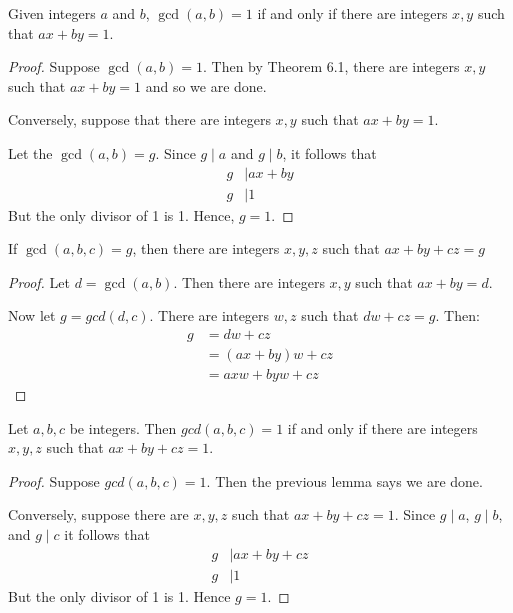 
\begin{lemma}
    Given integers $a$ and $b$, $\gcd(a,b) = 1$ if and only if there are
    integers $x, y$ such that $ax + by = 1$.
\end{lemma}
\begin{proof}
    Suppose $\gcd(a,b) = 1$. Then by Theorem 6.1, there are integers $x,y$ such
    that $ax+by=1$ and so we are done.
    
    Conversely, suppose that there are integers $x,y$ such that $ax+by=1$. 
    
    Let the $\gcd(a,b)=g$. Since $g \mid a$ and $g \mid b$, it follows that
    \begin{align*}
        g & \mid ax+by \\
        g & \mid 1
    \end{align*}
    But the only divisor of 1 is 1. Hence, $g=1$.
\end{proof}
    
\begin{lemma}
    If $\gcd(a,b,c) = g$, then there are integers $x,y,z$ such that 
    $ax + by + cz = g$
\end{lemma}
\begin{proof}
    Let $d=\gcd(a,b)$. Then there are integers $x,y$ such that $ax+by=d$.
    
    Now let $g=gcd(d,c)$. There are integers $w,z$ such that $dw+cz=g$. Then:
    \begin{align*}
        g &= dw + cz \\
          &= (ax+by)w + cz \\
          &= axw + byw + cz
    \end{align*}
\end{proof}

\begin{prop}
    Let $a,b,c$ be integers. Then $gcd(a,b,c) = 1$ if and only if there are
    integers $x,y,z$ such that $ax+by+cz=1$.
\end{prop}
\begin{proof}
    Suppose $gcd(a,b,c) = 1$. Then the previous lemma says we are done.
    
    Conversely, suppose there are $x,y,z$ such that $ax+by+cz=1$. Since 
    $g \mid a$, $g \mid b$, and $g \mid c$ it follows that
    \begin{align*}
        g & \mid ax+by+cz \\
        g & \mid 1
    \end{align*}
    But the only divisor of 1 is 1. Hence $g=1$.
\end{proof}

